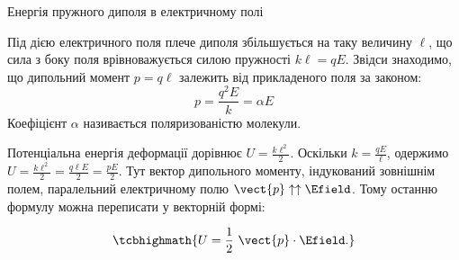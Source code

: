 \documentclass{beamer}
\begin{document}
\begin{frame}{Енергія пружного диполя в електричному полі}{}
	\begin{block}{}\justifying
		Під дією електричного поля плече диполя збільшується на таку величину $\ell$, що сила з боку
		поля врівноважується силою пружності
		$
			k\ell = qE
		$.
		Звідси знаходимо, що дипольний момент $p = q\ell$ залежить від прикладеного поля за законом:
		\begin{equation*}
			p = \frac{q^2E}{k} = \alpha E
		\end{equation*}
		Коефіцієнт $\alpha$ називається \alert{поляризованістю молекули}.

		\smallskip

		Потенціальна енергія деформації дорівнює
		$
			U = \frac{k\ell^2}2
		$.
		Оскільки $k = \frac{qE}{\ell}$, одержимо
		$
			U = \frac{k\ell^2}2 = \frac{q\ell E}2 = \frac{pE}2
		$.
		Тут вектор дипольного моменту, індукований зовнішнім полем, паралельний електричному полю
		$\vect{p}\uparrow\uparrow \Efield$. Тому останню формулу можна переписати у векторній формі:
	\end{block}
	\begin{equation*}
		\tcbhighmath{
			U = \frac12\ \vect{p}\cdot\Efield.
		}
	\end{equation*}
\end{frame}
\end{document}
